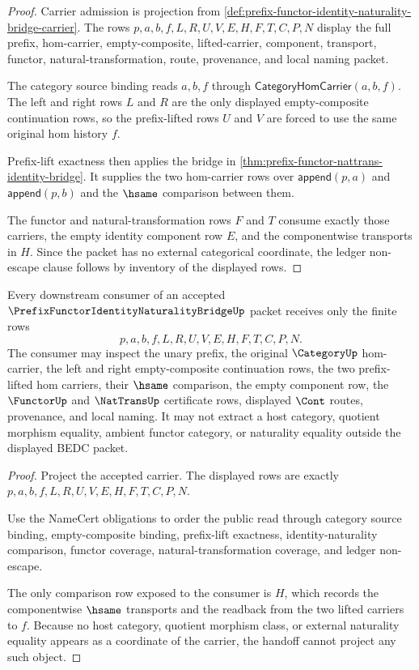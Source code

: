 \begin{proof}
Carrier admission is projection from \autoref{def:prefix-functor-identity-naturality-bridge-carrier}. The rows $p,a,b,f,L,R,U,V,E,H,F,T,C,P,N$ display the full prefix, hom-carrier, empty-composite, lifted-carrier, component, transport, functor, natural-transformation, route, provenance, and local naming packet.

The category source binding reads $a,b,f$ through $\mathsf{CategoryHomCarrier}(a,b,f)$. The left and right rows $L$ and $R$ are the only displayed empty-composite continuation rows, so the prefix-lifted rows $U$ and $V$ are forced to use the same original hom history $f$.

Prefix-lift exactness then applies the bridge in \autoref{thm:prefix-functor-nattrans-identity-bridge}. It supplies the two hom-carrier rows over $\mathsf{append}(p,a)$ and $\mathsf{append}(p,b)$ and the $\hsame$ comparison between them.

The functor and natural-transformation rows $F$ and $T$ consume exactly those carriers, the empty identity component row $E$, and the componentwise transports in $H$. Since the packet has no external categorical coordinate, the ledger non-escape clause follows by inventory of the displayed rows.
\end{proof}

\begin{theorem}
\label{thm:prefix-functor-identity-naturality-bridge-public-handoff}
Every downstream consumer of an accepted $\PrefixFunctorIdentityNaturalityBridgeUp$ packet receives only the finite rows
$$
p,a,b,f,L,R,U,V,E,H,F,T,C,P,N.
$$
The consumer may inspect the unary prefix, the original $\CategoryUp$ hom-carrier, the left and right empty-composite continuation rows, the two prefix-lifted hom carriers, their $\hsame$ comparison, the empty component row, the $\FunctorUp$ and $\NatTransUp$ certificate rows, displayed $\Cont$ routes, provenance, and local naming. It may not extract a host category, quotient morphism equality, ambient functor category, or naturality equality outside the displayed BEDC packet.
\end{theorem}
\begin{proof}
Project the accepted carrier. The displayed rows are exactly $p,a,b,f,L,R,U,V,E,H,F,T,C,P,N$.

Use the NameCert obligations to order the public read through category source binding, empty-composite binding, prefix-lift exactness, identity-naturality comparison, functor coverage, natural-transformation coverage, and ledger non-escape.

The only comparison row exposed to the consumer is $H$, which records the componentwise $\hsame$ transports and the readback from the two lifted carriers to $f$. Because no host category, quotient morphism class, or external naturality equality appears as a coordinate of the carrier, the handoff cannot project any such object.
\end{proof}

